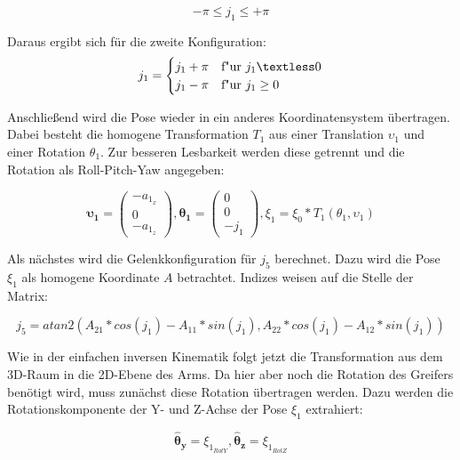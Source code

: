 \begin{equation}
-\pi \leq j_1 \leq +\pi 
\label{eq:17}
\end{equation}

Daraus ergibt sich für die zweite Konfiguration:
\begin{equation}
j_1 = 
\begin{cases}
j_1 + \pi & \text{f"ur } j_1  \textless 0 \\
j_1 - \pi & \text{f"ur } j_1  \ge 0 
\end{cases}
\label{eq:18}
\end{equation}

Anschließend wird die Pose wieder in ein anderes Koordinatensystem übertragen. Dabei besteht die homogene Transformation $T_1$ aus einer Translation $\upsilon_1$ und einer Rotation $\theta_1$. Zur besseren Lesbarkeit werden diese getrennt und die Rotation als Roll-Pitch-Yaw angegeben:

\begin{equation}
\pmb{\upsilon_1} = \left(\begin{array}{c} 
-a_{1_x} \\
0\\
-a_{1_z}
\end{array}\right)
,
\pmb{\theta_1} = \left(\begin{array}{c} 
0 \\
0\\
-j_1
\end{array}\right)	
,
\xi_1 = \xi_0 * T_1(\theta_1, \upsilon_1)	
\label{eq:19}
\end{equation}

Als nächstes wird die Gelenkkonfiguration für $j_5$ berechnet. Dazu wird die Pose $\xi_1$ als homogene Koordinate $A$ betrachtet. Indizes weisen auf die Stelle der Matrix:

\begin{equation}
j_5 = atan2(A_{21} * cos(j_1) - A_{11} * sin(j_1), A_{22}*cos(j_1)-A_{12} * sin(j_1))
\label{eq:27}
\end{equation}

Wie in der einfachen inversen Kinematik folgt jetzt die Transformation aus dem 3D-Raum in die 2D-Ebene des Arms. Da hier aber noch die Rotation des Greifers benötigt wird, muss zunächst diese Rotation übertragen werden. Dazu werden die Rotationskomponente der Y- und Z-Achse der Pose $\xi_1$ extrahiert:

\begin{equation}
\pmb{\hat{\theta}_y} = \xi_{1_{RotY}}, \pmb{\hat{\theta}_z} = \xi_{1_{RotZ}}  
\label{eq:20}
\end{equation}

